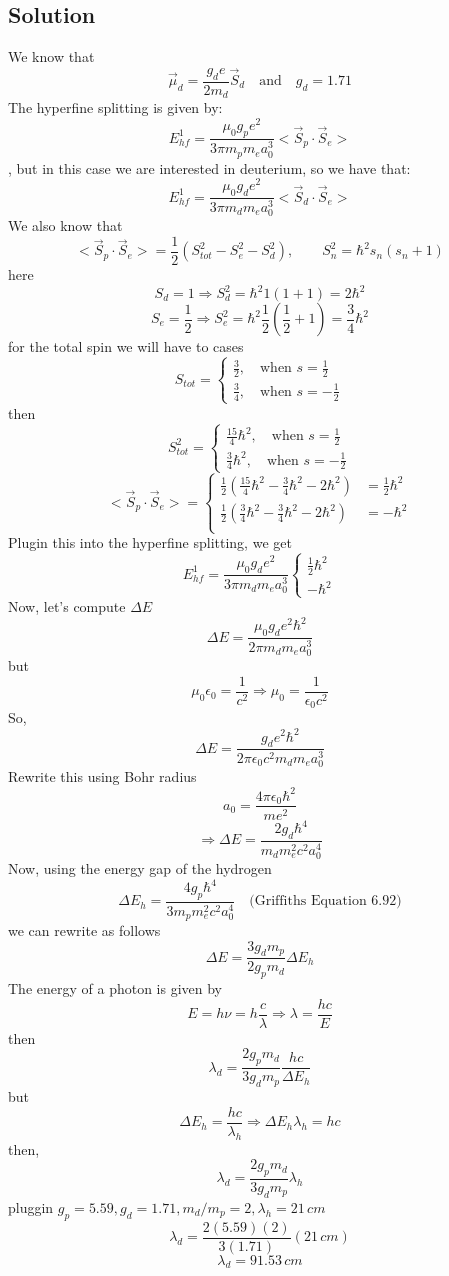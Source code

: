 \documentclass[12 pt]{article}
\numberwithin{equation}{section}
\begin{document}
\subsection*{Solution}
We know that 
\[
  \vec{\mu}_d = \frac{g_d e}{2m_d}\vec{S}_d\quad \text{and}\quad g_d = 1.71 
\]
The hyperfine splitting is given by:
\[
  E_{hf}^1 = \frac{\mu_0 g_p e^2}{3\pi m_p m_e a_0^3}\big<\vec{S}_p\cdot\vec{S}_e\big>
\]
, but in this case we are interested in deuterium, so we have that:
\[
  E_{hf}^1 = \frac{\mu_0 g_d e^2}{3\pi m_d m_e a_0^3}\big<\vec{S}_d\cdot\vec{S}_e\big>
\]
We also know that
\[
  \big<\vec{S}_p\cdot\vec{S}_e\big> =\frac{1}{2}\left( S_{tot}^2 - S_e^2 -S_d^2\right), 
  \qquad S_n^2 = \hbar^2s_n(s_n+1)
\]
here 
\[
  S_d = 1  \Rightarrow S_d^2 = \hbar^2 1(1+1) =2\hbar^2
\]
\[
  S_e = \frac{1}{2} \Rightarrow S_e^2 = \hbar^2 \frac{1}{2}\left(\frac{1}{2}+1\right) =
  \frac{3}{4}\hbar^2
\]
for the total spin we will have to cases
\[
  S_{tot} =
  \begin{cases}
    \frac{3}{2},\quad \text{when } s = \frac{1}{2}\\
    \frac{3}{4}, \quad \text{when } s = -\frac{1}{2}
  \end{cases}
\]
then 
\[
  S^2_{tot} =
  \begin{cases}
    \frac{15}{4}\hbar^2,\quad \text{when } s = \frac{1}{2}\\
    \frac{3}{4}\hbar^2, \quad \text{when } s = -\frac{1}{2}
  \end{cases}
\]
\[
\big<\vec{S}_p\cdot\vec{S}_e\big> = \begin{cases}
  \frac{1}{2}\left(\frac{15}{4}\hbar^2 - \frac{3}{4}\hbar^2 -2\hbar^2\right)&= \frac{1}{2}\hbar^2\\
\frac{1}{2}\left(\frac{3}{4}\hbar^2 - \frac{3}{4}\hbar^2 -2\hbar^2\right)&= -\hbar^2\\
\end{cases}
\]
Plugin this into the hyperfine splitting, we get
\[
 E_{hf}^1 =  \frac{\mu_0 g_d e^2}{3\pi m_d m_e a_0^3} \begin{cases}
    \frac{1}{2}\hbar^2\\
    -\hbar^2
  \end{cases}
\]
Now, let's compute $\Delta E$
\[
  \Delta E = \frac{\mu_0 g_d e^2\hbar^2}{2\pi m_d m_e a_0^3}
\]
but 
\[
  \mu_0 \epsilon_0 = \frac{1}{c^2} \Rightarrow \mu_0 =\frac{1}{\epsilon_0c^2}
\]
So, 
\[
 \Delta E = \frac{ g_d e^2\hbar^2}{2\pi\epsilon_0 c^2 m_d m_e a_0^3}
\]
Rewrite this using Bohr radius
\[
  a_0 = \frac{4\pi \epsilon_0 \hbar^2}{me^2}
\]
\[
\Rightarrow \Delta E = \frac{ 2g_d\hbar^4}{ m_d m_e^2 c^2 a_0^4} 
\]
Now, using the energy gap of the hydrogen 
\[
  \Delta E_{h} = \frac{4g_p\hbar^4}{3m_pm_e^2c^2a_0^4}\quad
  \text{(Griffiths Equation 6.92)}
\]
we can rewrite as follows
\[
  \Delta E = \frac{3g_dm_p}{2g_pm_d}\Delta E_{h}
\]
The energy of a photon is given by 
\[
  E = h\nu = h \frac{c}{\lambda} \Rightarrow \lambda = \frac{h c}{E}
\]
then
\[
  \lambda_d = \frac{2g_pm_d}{3g_dm_p}\frac{hc}{\Delta E_{h}}
\]
but
\[
  \Delta E_{h} = \frac{hc}{\lambda_{h}} \Rightarrow  \Delta E_{h}
  \lambda_{h} = hc
\]
then, 
\[
  \lambda_d = \frac{2g_pm_d}{3g_dm_p}\lambda_h 
\]
pluggin $g_p=5.59, g_d = 1.71,m_d/m_p = 2, \lambda_h = 21\,cm $
\[
  \lambda_d = \frac{2(5.59)(2)}{3(1.71)}(21\,cm)
\]
\[
 \boxed{\lambda_d = 91.53\,cm}
\]
\end{document}
